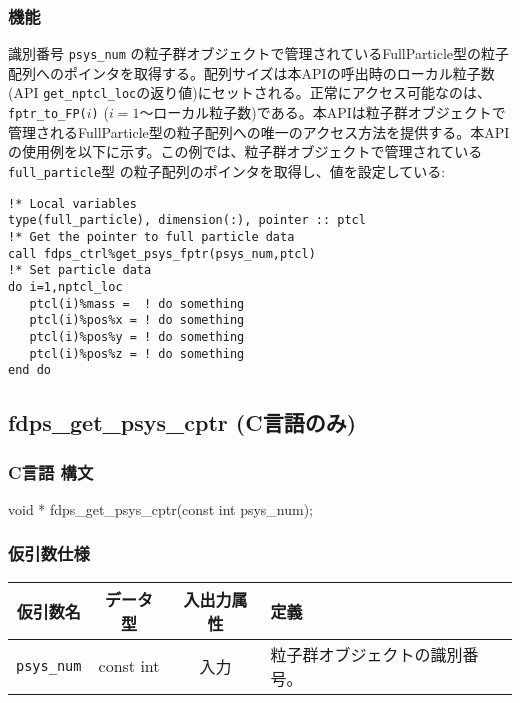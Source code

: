 \subsubsection*{機能}
識別番号 \texttt{psys\_num} の粒子群オブジェクトで管理されているFullParticle型の粒子配列へのポインタを取得する。配列サイズは本APIの呼出時のローカル粒子数(API \texttt{get\_nptcl\_loc}の返り値)にセットされる。正常にアクセス可能なのは、\texttt{fptr\_to\_FP(}$i$\texttt{)} ($i=1$〜ローカル粒子数)である。本APIは粒子群オブジェクトで管理されるFullParticle型の粒子配列への唯一のアクセス方法を提供する。本APIの使用例を以下に示す。この例では、粒子群オブジェクトで管理されている \texttt{full\_particle}型 の粒子配列のポインタを取得し、値を設定している:
\begin{lstlisting}[caption=API \texttt{get\_psys\_fptr}の使用例]
!* Local variables
type(full_particle), dimension(:), pointer :: ptcl
!* Get the pointer to full particle data
call fdps_ctrl%get_psys_fptr(psys_num,ptcl)
!* Set particle data
do i=1,nptcl_loc
   ptcl(i)%mass =  ! do something
   ptcl(i)%pos%x = ! do something
   ptcl(i)%pos%y = ! do something
   ptcl(i)%pos%z = ! do something
end do
\end{lstlisting}

\clearpage

\subsection{fdps\_get\_psys\_cptr {\small (C言語のみ)}}
\subsubsection*{C言語 構文}
\begin{screen}
\begin{spverbatim}
void * fdps_get_psys_cptr(const int psys_num);
\end{spverbatim}
\end{screen}

\subsubsection*{仮引数仕様}
\begin{table}[h]
\begin{tabularx}{\linewidth}{cccX}
\toprule
\rowcolor{Snow2}
仮引数名 & データ型 & 入出力属性 & 定義 \\
\midrule
\texttt{psys\_num} & const int & 入力 & 粒子群オブジェクトの識別番号。\\
\bottomrule
\end{tabularx}
\end{table}

